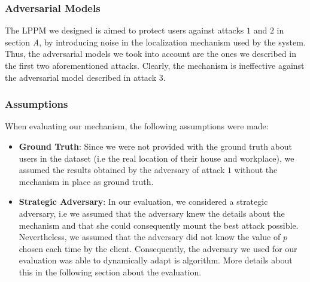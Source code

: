 \documentclass[10pt,conference,compsocconf]{IEEEtran}
\begin{document}
\subsubsection{Adversarial Models}
The LPPM we designed is aimed to protect users against attacks $1$ and $2$ in
section \textit{A}, by introducing noise in the localization mechanism used by
the system. Thus, the adversarial models we took into account are the ones we
described in the first two aforementioned attacks. Clearly, the mechanism is ineffective
against the adversarial model described in attack $3$.
\subsubsection{Assumptions}
When evaluating our mechanism, the following assumptions were made:
\begin{itemize}
    \item \textbf{Ground Truth}: Since we were not provided with the ground
    truth about users in the dataset (i.e the real location of their house and
    workplace), we assumed the results obtained by the adversary of attack $1$
    without the mechanism in place as ground truth.
    \item \textbf{Strategic Adversary}: In our evaluation, we considered a
    strategic adversary, i.e we assumed that the adversary knew the details
    about the mechanism and that she could consequently mount the best attack
    possible. Nevertheless, we assumed that the adversary did not know the value
    of $p$ chosen each time by the client.\newline
    Consequently, the adversary we used for our evaluation was able to
    dynamically adapt is algorithm. More details about this in the following
    section about the evaluation.
\end{itemize}
\end{document}

